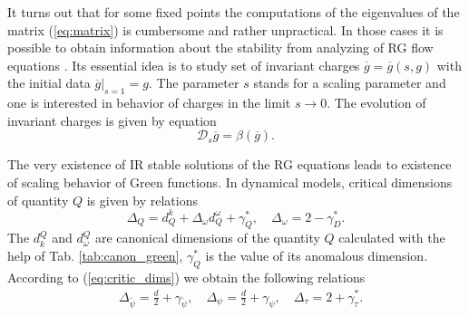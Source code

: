 \documentclass[aps,pre,url,twocolumn,superscriptaddress]{revtex4-1}
\begin{document}
It turns out that for some fixed points the computations of the eigenvalues
of the matrix (\ref{eq:matrix}) is cumbersome and rather unpractical. In those
cases it is possible to obtain information about the stability from
analyzing of RG flow equations \cite{Vasiliev}.
 Its essential idea is to study set of invariant charges $\overline{g} = \overline{g}(s,g)$
 with the initial data $\overline{g} |_{s=1} = g$. The parameter $s$
 stands for a scaling parameter and one is interested in behavior of charges in 
 the limit $s\rightarrow 0$. The evolution of invariant charges is given by
 equation
 \begin{equation}
   \mathcal{D}_s \overline{g} = \beta(\overline{g}).
   \label{eq:invariant_chrg}
 \end{equation}

 
The very existence of IR stable solutions of the RG equations leads
to existence of scaling behavior of Green functions. In dynamical
models, critical dimensions of quantity $Q$ is given by relations
\begin{equation}
   \Delta_Q = d^k_Q + \Delta_\omega d^\omega_Q + \gamma^*_Q, \quad
   \Delta_\omega = 2 - \gamma_D^*.
   \label{eq:critic_dims}
\end{equation}
The $d_k^Q$ and $d_\omega^Q$ are canonical dimensions of the quantity
$Q$ calculated with the help of Tab. \ref{tab:canon_green}, $\gamma_Q^*$ is the value
of its anomalous dimension. According to (\ref{eq:critic_dims}) we obtain the following relations
\begin{align}
   & \Delta_{\tilde{\psi}} = \frac{d}{2} + \gamma_{\tilde{\psi}},\quad
   \Delta_{\psi} = \frac{d}{2} + \gamma_\psi,\quad
   \Delta_\tau = 2 + \gamma_\tau^*.
\end{align}
\end{document}
